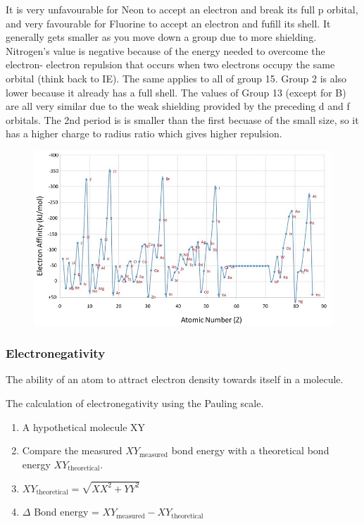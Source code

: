 \documentclass{article}
\begin{document}
    It is very unfavourable for Neon to accept an electron and break its full p orbital, and very favourable for
    Fluorine to accept an electron and fufill its shell. It generally gets smaller as you move down a group
    due to more shielding. Nitrogen's value is negative because of the energy needed to overcome the electron-
    electron repulsion that occurs when two electrons occupy the same orbital (think back to IE). 
    The same applies to all of group 15. Group 2 is also lower because it already has a full shell.
    The values of Group 13 (except for B) are all very similar due to the weak shielding provided by the 
    preceding d and f orbitals.
    The 2nd period is is smaller than the first becuase of the small size, so it has a higher charge to radius 
    ratio which gives higher repulsion.
    \begin{figure}[h]
        \centering
        \includegraphics[width=12cm]{ea2.png}
    \end{figure}
    \newpage
    \subsubsection{Electronegativity} The ability of an atom to attract electron density towards itself in a molecule.
    
    The calculation of electronegativity using the Pauling scale.
    \begin{enumerate}
        \item A hypothetical molecule XY
        \item Compare the measured \(XY_{\text{measured}}\) bond energy with a theoretical bond energy \(XY_{\text{theoretical}}.\)
        \item \(XY_{\text{theoretical}} = \sqrt{XX^2 + YY^2}\)
        \item \(\Delta\) Bond energy = \(XY_{\text{measured}} - XY_{\text{theoretical}}\)
    \end{enumerate}
\end{document}
